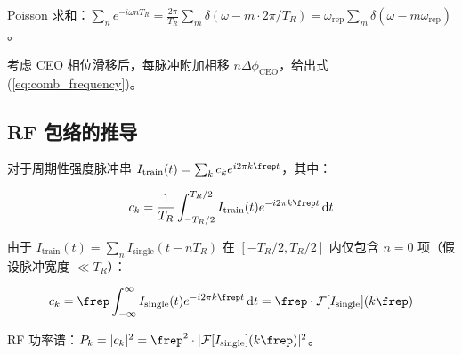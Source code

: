 \documentclass[11pt,a4paper]{article}
\newcommand{\FT}{\mathcal{F}}
\begin{document}
Poisson 求和：$\sum_n e^{-i\omega n T_R} = \frac{2\pi}{T_R} \sum_m \delta(\omega - m \cdot 2\pi/T_R) = \omega_{\text{rep}} \sum_m \delta(\omega - m \omega_{\text{rep}})$。

考虑 CEO 相位滑移后，每脉冲附加相移 $n \Delta\phi_{\text{CEO}}$，给出式(\ref{eq:comb_frequency})。

\subsection{RF 包络的推导}

对于周期性强度脉冲串 $I_{\text{train}}(t) = \sum_k c_k e^{i 2\pi k \frep t}$，其中：

\begin{equation}
c_k = \frac{1}{T_R} \int_{-T_R/2}^{T_R/2} I_{\text{train}}(t) e^{-i 2\pi k \frep t} \dd{t}
\end{equation}

由于 $I_{\text{train}}(t) = \sum_n I_{\text{single}}(t - nT_R)$ 在 $[-T_R/2, T_R/2]$ 内仅包含 $n=0$ 项（假设脉冲宽度 $\ll T_R$）：

\begin{equation}
c_k = \frep \int_{-\infty}^{\infty} I_{\text{single}}(t) e^{-i 2\pi k \frep t} \dd{t} = \frep \cdot \FT[I_{\text{single}}](k\frep)
\end{equation}

RF 功率谱：$P_k = |c_k|^2 = \frep^2 \cdot |\FT[I_{\text{single}}](k\frep)|^2$。
\end{document}

